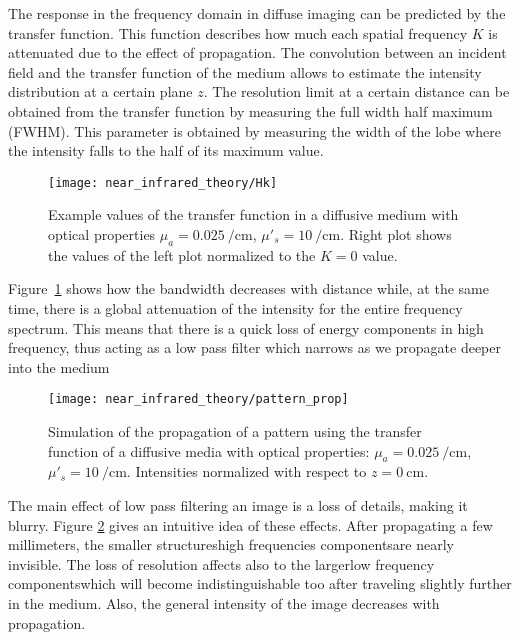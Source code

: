 The response in the frequency domain in diffuse imaging can be predicted by the transfer function. This function describes how much each spatial frequency $K$ is attenuated due to the effect of propagation. The convolution between an incident field and the transfer function of the medium allows to estimate the intensity distribution at a certain plane $z$. The resolution limit at a certain distance can be obtained from the transfer function by measuring the full width half maximum (FWHM). This parameter is obtained by measuring the width of the lobe where the intensity falls to the half of its maximum value.
\begin{figure}[t!]
\centering
\texttt{[image: near\_infrared\_theory/Hk]}
\caption[Transfer function in a diffusive medium with optical properties {$\mu_a=\SI[per-mode=reciprocal]{0.025}{\per\cm}$}, {$\mu'_s=\SI[per-mode=reciprocal]{10}{\per\cm}$}]{Example values of the transfer function in a diffusive medium with optical properties $\mu_a=\SI[per-mode=reciprocal]{0.025}{\per\cm}$, $\mu'_s=\SI[per-mode=reciprocal]{10}{\per\cm}$. Right plot shows the values of the left plot normalized to the $K=0$ value. }
\label{fig:theory_transfer_function} 
\end{figure}

Figure~\ref{fig:theory_transfer_function} shows how the bandwidth decreases with distance while, at the same time, there is a global attenuation of the intensity for the entire frequency spectrum. This means that there is a quick loss of energy components in high frequency, thus acting as a low pass filter which narrows as we propagate deeper into the medium

\begin{figure}[b!]
\centering
\texttt{[image: near\_infrared\_theory/pattern\_prop]}
\caption[Simulation of the propagation of a pattern in diffusive media]{Simulation of the propagation of a pattern using the transfer function of a diffusive media with optical properties: $\mu_a=\SI[per-mode=reciprocal]{0.025}{\per\cm}$, $\mu'_s=\SI[per-mode=reciprocal]{10}{\per\cm}$. Intensities normalized with respect to $z = \SI{0}{\cm}$.}
\label{fig:theory_pattern prop}
\end{figure}

The main effect of low pass filtering an image is a loss of details, making it blurry. Figure \ref{fig:theory_pattern prop} gives an intuitive idea of these effects. After propagating a few millimeters, the smaller structures\textemdash high frequencies components\textemdash are nearly invisible. The loss of resolution affects also to the larger\textemdash low frequency components\textemdash which will become indistinguishable too after traveling slightly further in the medium. Also, the general intensity of the image decreases with propagation.

